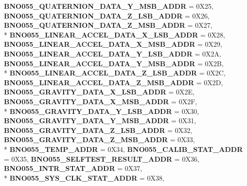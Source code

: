 \begin{DoxyCompactItemize}
{\bfseries B\-N\-O055\-\_\-\-Q\-U\-A\-T\-E\-R\-N\-I\-O\-N\-\_\-\-D\-A\-T\-A\-\_\-\-Y\-\_\-\-M\-S\-B\-\_\-\-A\-D\-D\-R} = 0\-X25, 
{\bfseries B\-N\-O055\-\_\-\-Q\-U\-A\-T\-E\-R\-N\-I\-O\-N\-\_\-\-D\-A\-T\-A\-\_\-\-Z\-\_\-\-L\-S\-B\-\_\-\-A\-D\-D\-R} = 0\-X26, 
{\bfseries B\-N\-O055\-\_\-\-Q\-U\-A\-T\-E\-R\-N\-I\-O\-N\-\_\-\-D\-A\-T\-A\-\_\-\-Z\-\_\-\-M\-S\-B\-\_\-\-A\-D\-D\-R} = 0\-X27, 
\\*
{\bfseries B\-N\-O055\-\_\-\-L\-I\-N\-E\-A\-R\-\_\-\-A\-C\-C\-E\-L\-\_\-\-D\-A\-T\-A\-\_\-\-X\-\_\-\-L\-S\-B\-\_\-\-A\-D\-D\-R} = 0\-X28, 
{\bfseries B\-N\-O055\-\_\-\-L\-I\-N\-E\-A\-R\-\_\-\-A\-C\-C\-E\-L\-\_\-\-D\-A\-T\-A\-\_\-\-X\-\_\-\-M\-S\-B\-\_\-\-A\-D\-D\-R} = 0\-X29, 
{\bfseries B\-N\-O055\-\_\-\-L\-I\-N\-E\-A\-R\-\_\-\-A\-C\-C\-E\-L\-\_\-\-D\-A\-T\-A\-\_\-\-Y\-\_\-\-L\-S\-B\-\_\-\-A\-D\-D\-R} = 0\-X2\-A, 
{\bfseries B\-N\-O055\-\_\-\-L\-I\-N\-E\-A\-R\-\_\-\-A\-C\-C\-E\-L\-\_\-\-D\-A\-T\-A\-\_\-\-Y\-\_\-\-M\-S\-B\-\_\-\-A\-D\-D\-R} = 0\-X2\-B, 
\\*
{\bfseries B\-N\-O055\-\_\-\-L\-I\-N\-E\-A\-R\-\_\-\-A\-C\-C\-E\-L\-\_\-\-D\-A\-T\-A\-\_\-\-Z\-\_\-\-L\-S\-B\-\_\-\-A\-D\-D\-R} = 0\-X2\-C, 
{\bfseries B\-N\-O055\-\_\-\-L\-I\-N\-E\-A\-R\-\_\-\-A\-C\-C\-E\-L\-\_\-\-D\-A\-T\-A\-\_\-\-Z\-\_\-\-M\-S\-B\-\_\-\-A\-D\-D\-R} = 0\-X2\-D, 
{\bfseries B\-N\-O055\-\_\-\-G\-R\-A\-V\-I\-T\-Y\-\_\-\-D\-A\-T\-A\-\_\-\-X\-\_\-\-L\-S\-B\-\_\-\-A\-D\-D\-R} = 0\-X2\-E, 
{\bfseries B\-N\-O055\-\_\-\-G\-R\-A\-V\-I\-T\-Y\-\_\-\-D\-A\-T\-A\-\_\-\-X\-\_\-\-M\-S\-B\-\_\-\-A\-D\-D\-R} = 0\-X2\-F, 
\\*
{\bfseries B\-N\-O055\-\_\-\-G\-R\-A\-V\-I\-T\-Y\-\_\-\-D\-A\-T\-A\-\_\-\-Y\-\_\-\-L\-S\-B\-\_\-\-A\-D\-D\-R} = 0\-X30, 
{\bfseries B\-N\-O055\-\_\-\-G\-R\-A\-V\-I\-T\-Y\-\_\-\-D\-A\-T\-A\-\_\-\-Y\-\_\-\-M\-S\-B\-\_\-\-A\-D\-D\-R} = 0\-X31, 
{\bfseries B\-N\-O055\-\_\-\-G\-R\-A\-V\-I\-T\-Y\-\_\-\-D\-A\-T\-A\-\_\-\-Z\-\_\-\-L\-S\-B\-\_\-\-A\-D\-D\-R} = 0\-X32, 
{\bfseries B\-N\-O055\-\_\-\-G\-R\-A\-V\-I\-T\-Y\-\_\-\-D\-A\-T\-A\-\_\-\-Z\-\_\-\-M\-S\-B\-\_\-\-A\-D\-D\-R} = 0\-X33, 
\\*
{\bfseries B\-N\-O055\-\_\-\-T\-E\-M\-P\-\_\-\-A\-D\-D\-R} = 0\-X34, 
{\bfseries B\-N\-O055\-\_\-\-C\-A\-L\-I\-B\-\_\-\-S\-T\-A\-T\-\_\-\-A\-D\-D\-R} = 0\-X35, 
{\bfseries B\-N\-O055\-\_\-\-S\-E\-L\-F\-T\-E\-S\-T\-\_\-\-R\-E\-S\-U\-L\-T\-\_\-\-A\-D\-D\-R} = 0\-X36, 
{\bfseries B\-N\-O055\-\_\-\-I\-N\-T\-R\-\_\-\-S\-T\-A\-T\-\_\-\-A\-D\-D\-R} = 0\-X37, 
\\*
{\bfseries B\-N\-O055\-\_\-\-S\-Y\-S\-\_\-\-C\-L\-K\-\_\-\-S\-T\-A\-T\-\_\-\-A\-D\-D\-R} = 0\-X38, 

\end{DoxyCompactItemize}
